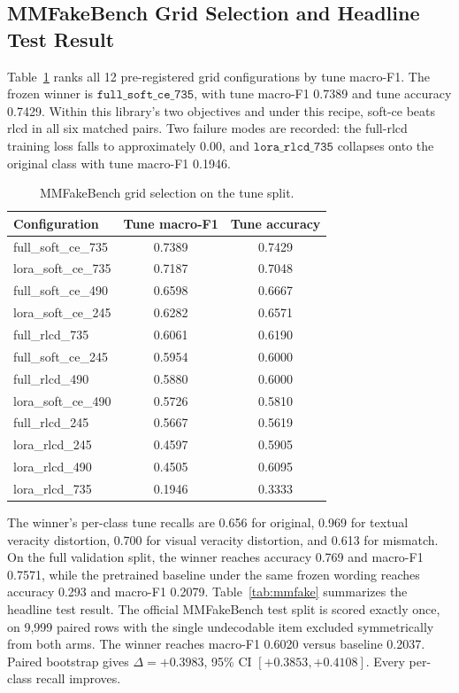 \documentclass{article} %
\begin{document}
\subsection{MMFakeBench Grid Selection and Headline Test Result}
Table~\ref{tab:grid} ranks all 12 pre-registered grid configurations by tune macro-F1. The frozen winner is \( \texttt{full\_soft\_ce\_735} \), with tune macro-F1 0.7389 and tune accuracy 0.7429. Within this library's two objectives and under this recipe, soft-ce beats rlcd in all six matched pairs. Two failure modes are recorded: the full-rlcd training loss falls to approximately 0.00, and \( \texttt{lora\_rlcd\_735} \) collapses onto the original class with tune macro-F1 0.1946.

\begin{table}[t]
\centering
\small
\caption{MMFakeBench grid selection on the tune split.}
\label{tab:grid}
\begin{tabular}{lcc}
\toprule
Configuration & Tune macro-F1 & Tune accuracy \\
\midrule
full\_soft\_ce\_735 & 0.7389 & 0.7429 \\
lora\_soft\_ce\_735 & 0.7187 & 0.7048 \\
full\_soft\_ce\_490 & 0.6598 & 0.6667 \\
lora\_soft\_ce\_245 & 0.6282 & 0.6571 \\
full\_rlcd\_735 & 0.6061 & 0.6190 \\
full\_soft\_ce\_245 & 0.5954 & 0.6000 \\
full\_rlcd\_490 & 0.5880 & 0.6000 \\
lora\_soft\_ce\_490 & 0.5726 & 0.5810 \\
full\_rlcd\_245 & 0.5667 & 0.5619 \\
lora\_rlcd\_245 & 0.4597 & 0.5905 \\
lora\_rlcd\_490 & 0.4505 & 0.6095 \\
lora\_rlcd\_735 & 0.1946 & 0.3333 \\
\bottomrule
\end{tabular}
\end{table}

The winner's per-class tune recalls are 0.656 for original, 0.969 for textual veracity distortion, 0.700 for visual veracity distortion, and 0.613 for mismatch. On the full validation split, the winner reaches accuracy 0.769 and macro-F1 0.7571, while the pretrained baseline under the same frozen wording reaches accuracy 0.293 and macro-F1 0.2079. Table~\ref{tab:mmfake} summarizes the headline test result. The official MMFakeBench test split is scored exactly once, on 9,999 paired rows with the single undecodable item excluded symmetrically from both arms. The winner reaches macro-F1 0.6020 versus baseline 0.2037. Paired bootstrap gives \(\Delta=+0.3983\), 95\% CI \([+0.3853, +0.4108]\). Every per-class recall improves.
\end{document}
